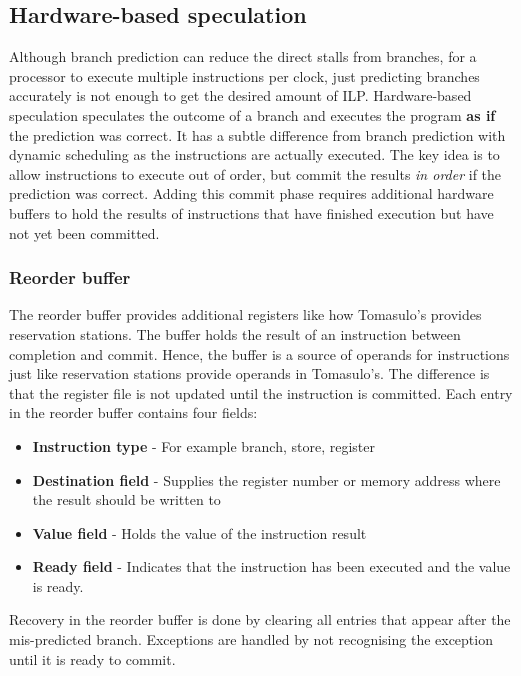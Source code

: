 \documentclass[11pt]{article}
\begin{document}
\subsection{Hardware-based speculation}
Although branch prediction can reduce the direct stalls from branches, for a processor to execute multiple instructions per clock, just predicting branches accurately is not enough to get the desired amount of ILP. 
\n
Hardware-based speculation speculates the outcome of a branch and executes the program \textbf{as if} the prediction was correct. It has a subtle difference from branch prediction with dynamic scheduling as the instructions are actually executed. The key idea is to allow instructions to execute out of order, but commit the results \textit{in order} if the prediction was correct. Adding this commit phase requires additional hardware buffers to hold the results of instructions that have finished execution but have not yet been committed. 

\subsubsection{Reorder buffer}
The reorder buffer provides additional registers like how Tomasulo's provides reservation stations. The buffer holds the result of an instruction between completion and commit. Hence, the buffer is a source of operands for instructions just like reservation stations provide operands in Tomasulo's. The difference is that the register file is not updated until the instruction is committed. 
\n
Each entry in the reorder buffer contains four fields:
\begin{itemize}
\item \textbf{Instruction type} - For example branch, store, register
\item \textbf{Destination field} - Supplies the register number or memory address where the result should be written to
\item \textbf{Value field} - Holds the value of the instruction result
\item \textbf{Ready field} - Indicates that the instruction has been executed and the value is ready.
\end{itemize}
\noindent
Recovery in the reorder buffer is done by clearing all entries that appear after the mis-predicted branch. Exceptions are handled by not recognising the exception until it is ready to commit. 
\end{document}
